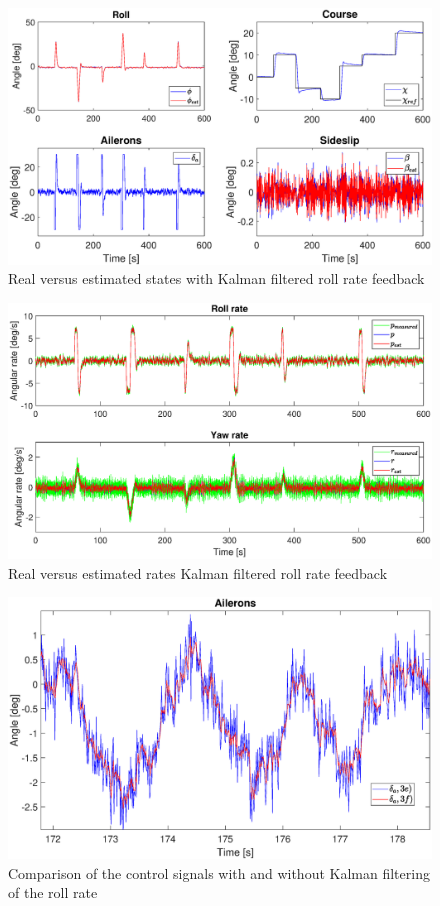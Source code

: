 \begin{figure}[h!]
    \centering
    \includegraphics[width=\textwidth]{figures/prob3f.eps}
    \caption{Real versus estimated states with Kalman filtered roll rate feedback}
    \label{fig:3f}
\end{figure}
\begin{figure}[h!]
    \centering
    \includegraphics[width=\textwidth]{figures/prob3f_rates.eps}
    \caption{Real versus estimated rates Kalman filtered roll rate feedback}
    \label{fig:3f_rates}
\end{figure}
\begin{figure}[h!]
    \centering
    \includegraphics[width=\textwidth]{figures/prob3e_vs_3f.eps}
    \caption{Comparison of the control signals with and without Kalman filtering of the roll rate}
    \label{fig:3e_3f_comparison}
\end{figure}


